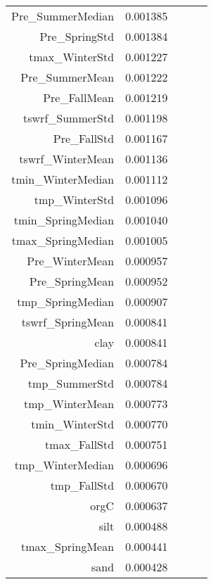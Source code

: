 \begin{tabular}{rrrrr}
Pre_SummerMedian & 0.001385 \\
Pre_SpringStd & 0.001384 \\
tmax_WinterStd & 0.001227 \\
Pre_SummerMean & 0.001222 \\
Pre_FallMean & 0.001219 \\
tswrf_SummerStd & 0.001198 \\
Pre_FallStd & 0.001167 \\
tswrf_WinterMean & 0.001136 \\
tmin_WinterMedian & 0.001112 \\
tmp_WinterStd & 0.001096 \\
tmin_SpringMedian & 0.001040 \\
tmax_SpringMedian & 0.001005 \\
Pre_WinterMean & 0.000957 \\
Pre_SpringMean & 0.000952 \\
tmp_SpringMedian & 0.000907 \\
tswrf_SpringMean & 0.000841 \\
clay & 0.000841 \\
Pre_SpringMedian & 0.000784 \\
tmp_SummerStd & 0.000784 \\
tmp_WinterMean & 0.000773 \\
tmin_WinterStd & 0.000770 \\
tmax_FallStd & 0.000751 \\
tmp_WinterMedian & 0.000696 \\
tmp_FallStd & 0.000670 \\
orgC & 0.000637 \\
silt & 0.000488 \\
tmax_SpringMean & 0.000441 \\
sand & 0.000428 \\
\bottomrule
\end{tabular}
